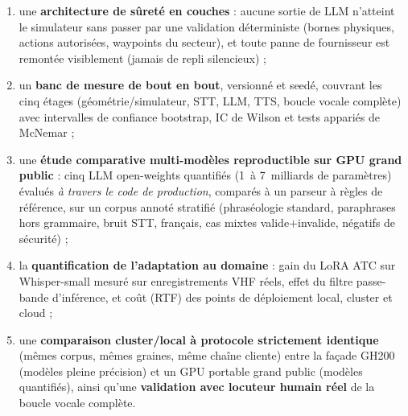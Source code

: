 \documentclass[10pt,a4paper]{article}
\begin{document}
\begin{enumerate}
  \item une \textbf{architecture de sûreté en couches} : aucune sortie de LLM
        n'atteint le simulateur sans passer par une validation déterministe
        (bornes physiques, actions autorisées, waypoints du secteur), et toute
        panne de fournisseur est remontée visiblement (jamais de repli
        silencieux) ;
  \item un \textbf{banc de mesure de bout en bout}, versionné et seedé,
        couvrant les cinq étages (géométrie/simulateur, STT, LLM, TTS, boucle
        vocale complète) avec intervalles de confiance bootstrap, IC de Wilson
        et tests appariés de McNemar ;
  \item une \textbf{étude comparative multi-modèles reproductible sur GPU
        grand public} : cinq LLM open-weights quantifiés (1~à 7~milliards de
        paramètres) évalués \emph{à travers le code de production}, comparés
        à un parseur à règles de référence, sur un corpus annoté stratifié
        (phraséologie standard, paraphrases hors grammaire, bruit STT,
        français, cas mixtes valide$+$invalide, négatifs de sécurité) ;
  \item la \textbf{quantification de l'adaptation au domaine} : gain du LoRA
        ATC sur Whisper-small mesuré sur enregistrements VHF réels, effet du
        filtre passe-bande d'inférence, et coût (RTF) des points de
        déploiement local, cluster et cloud ;
  \item une \textbf{comparaison cluster/local à protocole strictement
        identique} (mêmes corpus, mêmes graines, même chaîne cliente) entre la
        façade GH200 (modèles pleine précision) et un GPU portable grand
        public (modèles quantifiés), ainsi qu'une \textbf{validation avec
        locuteur humain réel} de la boucle vocale complète.
\end{enumerate}
\end{document}
